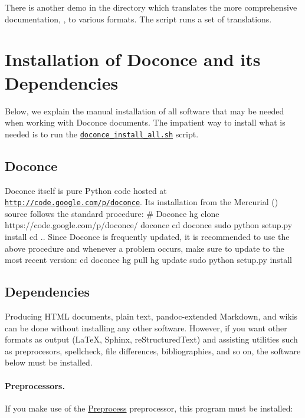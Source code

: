 \documentclass[%
oneside,                 %
final,                   %
10pt]{article}
\begin{document}
There is another demo in the  directory which
translates the more comprehensive documentation, , to
various formats. The  script runs a set of translations.



\section{Installation of Doconce and its Dependencies}

Below, we explain the manual installation of all software that may be
needed when working with Doconce documents.
The impatient way to install what is needed is to run the
\href{{doconce_install_all.sh}}{\nolinkurl{doconce_install_all.sh}} script.

\subsection{Doconce}

Doconce itself is pure Python code hosted at \href{{http://code.google.com/p/doconce}}{\nolinkurl{http://code.google.com/p/doconce}}.  Its installation from the
Mercurial () source follows the standard procedure:
\bsys
# Doconce
hg clone https://code.google.com/p/doconce/ doconce
cd doconce
sudo python setup.py install
cd ..
\esys
Since Doconce is frequently updated, it is recommended to use the
above procedure and whenever a problem occurs, make sure to
update to the most recent version:
\bsys
cd doconce
hg pull
hg update
sudo python setup.py install
\esys


\subsection{Dependencies}

Producing HTML documents, plain text, pandoc-extended Markdown,
and wikis can be done without installing any other
software. However, if you want other formats as output
({\LaTeX}, Sphinx, reStructuredText) and assisting utilities such
as preprocesors, spellcheck, file differences, bibliographies,
and so on, the software below must be installed.


\paragraph{Preprocessors.}
If you make use of the \href{{http://code.google.com/p/preprocess}}{Preprocess}
preprocessor, this program must be installed:
\end{document}
